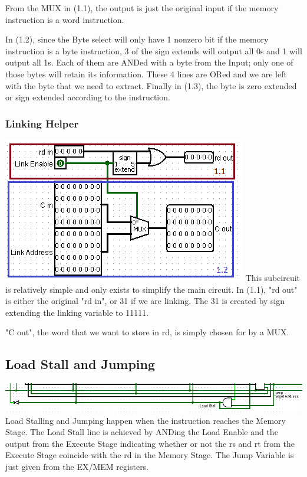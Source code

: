 \documentclass{article}
\begin{document}
 From the MUX in (1.1), the output is just the original input if the memory instruction is a word instruction. 
 
 In (1.2), since the Byte select will only have 1 nonzero bit if the memory instruction is a byte instruction, 3 of the sign extends will output all 0s and 1 will output all 1s. Each of them are ANDed with a byte from the Input; only one of those bytes will retain its information. These 4 lines are ORed and we are left with the byte that we need to extract. Finally in (1.3), the byte is zero extended or sign extended according to the instruction.
 
\subsubsection{Linking Helper}
\includegraphics{Linking.png}
This subcircuit is relatively simple and only exists to simplify the main circuit. In (1.1), "rd out" is either the original "rd in", or 31 if we are linking. The 31 is created by sign extending the linking variable to 11111.

"C out", the word that we want to store in rd, is simply chosen for by a MUX.

\subsection{Load Stall and Jumping}
\includegraphics{Disable.png}
Load Stalling and Jumping happen when the instruction reaches the Memory Stage. The Load Stall line is achieved by ANDing the Load Enable and the output from the Execute Stage indicating whether or not the rs and rt from the Execute Stage coincide with the rd in the Memory Stage. The Jump Variable is just given from the EX/MEM registers. 
\end{document}
